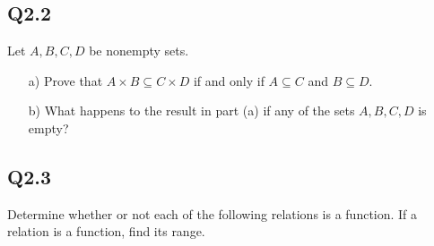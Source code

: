 \documentclass{article}
\begin{document}
\subsection*{Q2.2}
Let \( A, B, C, D \) be nonempty sets.
\begin{enumerate}
    \item[a)] Prove that \( A \times B \subseteq C \times D \) if and only if \( A \subseteq C \) and \( B \subseteq D \).
    \item[b)] What happens to the result in part (a) if any of the sets \( A, B, C, D \) is empty?
\end{enumerate}
\newpage

\subsection*{Q2.3}
 Determine whether or not each of the following relations is a function. If a relation is a function, find its range.
\end{document}
